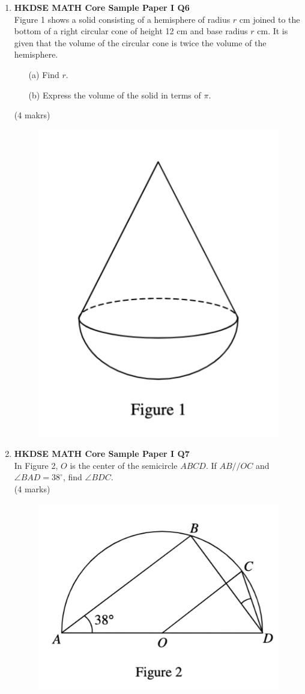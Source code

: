 \documentclass[12pt]{article}
\begin{document}
\begin{enumerate}
	\item \textbf{HKDSE MATH Core Sample Paper I Q6}\\
	Figure 1 shows a solid consisting of a hemisphere of radius $r$ cm joined to the bottom of a right circular cone of height 12 cm and base radius $r$ cm. It is given that the volume of the circular cone is twice the volume of the hemisphere.
	\begin{enumerate}
		\item[(a)] Find $r$.
		\item[(b)] Express the volume of the solid in terms of $\pi$.
	\end{enumerate}
	(4 makrs)
	\begin{figure}[H]
		\centering
		\includegraphics[width = .5\linewidth]{SPFigure1.1}
	\end{figure}

	\item \textbf{HKDSE MATH Core Sample Paper I Q7}\\
	In Figure 2, $O$ is the center of the semicircle $ABCD$. If $AB//OC$ and $\angle BAD = 38^\circ$, find $\angle BDC$. \\(4 marks)
	\begin{figure}[H]
		\centering
		\includegraphics[width = .5\linewidth]{SPFigure1.2}
	\end{figure}


\end{enumerate}
\end{document}
